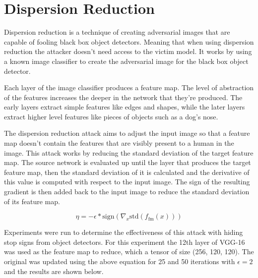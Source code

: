 \documentclass{article}
\begin{document}
\section{Dispersion Reduction}
Dispersion reduction \cite{Lu_2020_CVPR} is a technique of creating adversarial images that are capable of fooling black box object detectors. Meaning that when using dispersion reduction the attacker doesn't need access to the victim model. It works by using a known image classifier to create the adversarial image for the black box object detector.

Each layer of the image classifier produces a feature map. The level of abstraction of the features increases the deeper in the network that they're produced. The early layers extract simple features like edges and shapes, while the later layers extract higher level features like pieces of objects such as a dog's nose. \cite{olah2017feature}

The dispersion reduction attack aims to adjust the input image so that a feature map doesn't contain the features that are visibly present to a human in the image. This attack works by reducing the standard deviation of the target feature map. The source network is evaluated up until the layer that produces the target feature map, then the standard deviation of it is calculated and the derivative of this value is computed with respect to the input image. The sign of the resulting gradient is then added back to the input image to reduce the standard deviation of its feature map.

\begin{equation}
    \eta = - \epsilon * \text{sign}(\nabla_x \text{std}(f_{\text{fm}}(x)))
\end{equation}

Experiments were run to determine the effectiveness of this attack with hiding stop signs from object detectors. For this experiment the 12th layer of VGG-16 was used as the feature map to reduce, which a tensor of size (256, 120, 120). The original was updated using the above equation for 25 and 50 iterations with $\epsilon = 2$ and the results are shown below.
\end{document}
